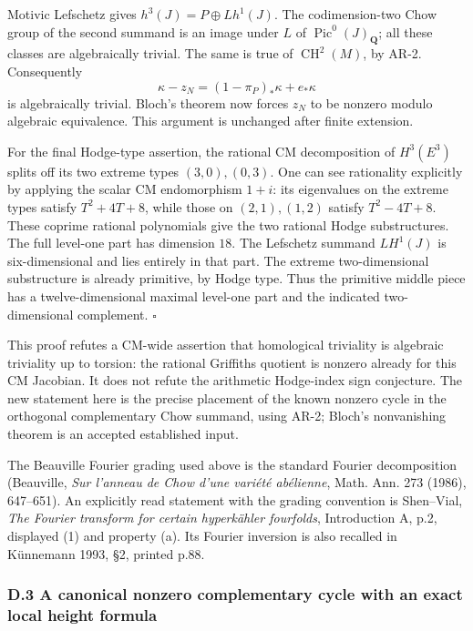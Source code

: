 \documentclass[11pt,a4paper]{article}
\begin{document}
Motivic Lefschetz gives \(h^3(J)=P\oplus Lh^1(J)\). The codimension-two
Chow group of the second summand is an image under \(L\) of
\(\operatorname{Pic}^0(J)_{\mathbf Q}\); all these classes are
algebraically trivial. The same is true of \(\operatorname{CH}^2(M)\),
by AR-2. Consequently \[
\kappa-z_N=(1-\pi_P)_*\kappa+e_*\kappa
\] is algebraically trivial. Bloch's theorem now forces \(z_N\) to be
nonzero modulo algebraic equivalence. This argument is unchanged after
finite extension.

For the final Hodge-type assertion, the rational CM decomposition of
\(H^3(E^3)\) splits off its two extreme types \((3,0),(0,3)\). One can
see rationality explicitly by applying the scalar CM endomorphism
\(1+i\): its eigenvalues on the extreme types satisfy \(T^2+4T+8\),
while those on \((2,1),(1,2)\) satisfy \(T^2-4T+8\). These coprime
rational polynomials give the two rational Hodge substructures. The full
level-one part has dimension \(18\). The Lefschetz summand \(LH^1(J)\)
is six-dimensional and lies entirely in that part. The extreme
two-dimensional substructure is already primitive, by Hodge type. Thus
the primitive middle piece has a twelve-dimensional maximal level-one
part and the indicated two-dimensional complement. \(\square\)

This proof refutes a CM-wide assertion that homological triviality is
algebraic triviality up to torsion: the rational Griffiths quotient is
nonzero already for this CM Jacobian. It does not refute the arithmetic
Hodge-index sign conjecture. The new statement here is the precise
placement of the known nonzero cycle in the orthogonal complementary
Chow summand, using AR-2; Bloch's nonvanishing theorem is an accepted
established input.

The Beauville Fourier grading used above is the standard Fourier
decomposition (Beauville, \emph{Sur l'anneau de Chow d'une variété
abélienne}, Math. Ann. 273 (1986), 647--651). An explicitly read
statement with the grading convention is Shen--Vial, \emph{The Fourier
transform for certain hyperkähler fourfolds}, Introduction A, p.2,
displayed (1) and property (a). Its Fourier inversion is also recalled
in Künnemann 1993, §2, printed p.88.

\subsubsection{D.3 A canonical nonzero complementary cycle with an exact
local height
formula}\label{d.3-a-canonical-nonzero-complementary-cycle-with-an-exact-local-height-formula}
\end{document}
